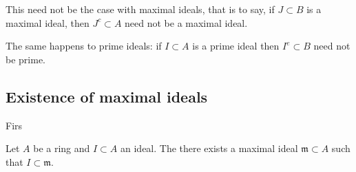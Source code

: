 This need not be the case with maximal ideals, that is to say, if $J \subset B$ is a maximal ideal, then $J^c \subset A$ need not be a maximal ideal.

The same happens to prime ideals: if $I \subset A$ is a prime ideal then $I^e \subset B$ need not be prime.





\subsection{Existence of maximal ideals}

Firs

\begin{theorem}
	Let $A$ be a ring and $I \subset A$ an ideal. The there exists a maximal ideal $\mathfrak{m} \subset A$ such that $I \subset \mathfrak{m}$.
\end{theorem}




